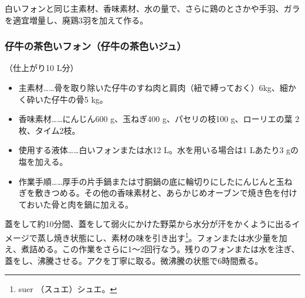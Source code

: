 \begin{recette}

 

白いフォンと同じ主素材、香味素材、水の量で、さらに鶏のとさかや手羽、ガラを適宜増量し、廃鶏3羽を加えて作る。

\atoaki{}

\hypertarget{jus-de-veau-brun}{%
\subsubsection{仔牛の茶色いフォン（仔牛の茶色いジュ）}\label{jus-de-veau-brun}}



（仕上がり10 L分）

\begin{itemize}
\item
  主素材\ldots{}\ldots{}骨を取り除いた仔牛のすね肉と肩肉（紐で縛っておく）6kg、細かく砕いた仔牛の骨5
  kg。
\item
  香味素材\ldots{}\ldots{}にんじん600 g、玉ねぎ400 g、パセリの枝100
  g、ローリエの葉 2枚、タイム2枝。
\item
  使用する液体\ldots{}\ldots{}白いフォンまたは水12 L。水を用いる場合は1
  Lあたり3 gの塩を加える。
\item
  作業手順\ldots{}\ldots{}厚手の片手鍋または寸胴鍋の底に輪切りにしたにんじんと玉ねぎを敷きつめる。その他の香味素材と、あらかじめオーブンで焼き色を付けておいた骨と肉を鍋に加える。
\end{itemize}

蓋をして約10分間、蓋をして弱火にかけた野菜から水分が汗をかくように出るイメージで蒸し焼き状態にし、素材の味を引き出す\footnote{suer
  （スュエ）シュエ。}。フォンまたは水少量を加え、煮詰める。この作業をさらに1〜2回行なう。残りのフォンまたは水を注ぎ、蓋をし、沸騰させる。アクを丁寧に取る。微沸騰の状態で6時間煮る。


\end{recette}
